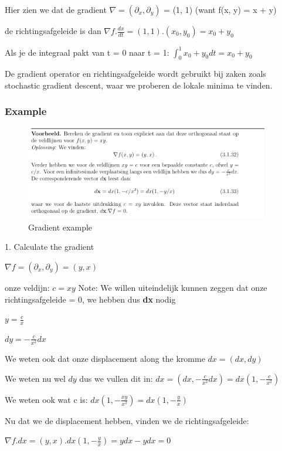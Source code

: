 \documentclass[a4paper]{report}
\begin{document}
Hier zien we dat de gradient $\nabla = (\partial_x, \partial_y)$ = (1, 1) (want f(x, y) = x + y)

de richtingsafgeleide is dan $\nabla f . \frac{dx}{dt} = (1, 1) . (x_0, y_0) = x_0 + y_0$

Als je de integraal pakt van t = 0 naar t = 1: $\int_0^1 x_0 + y_0 dt = x_0 + y_0$

De gradient operator en richtingsafgeleide wordt gebruikt bij zaken zoals stochastic gradient descent, waar we proberen de lokale minima te vinden.

\subsubsection{Example}
\begin{figure}[H]
	\begin{center}
		\includegraphics[width=0.95\textwidth]{./images/gradient_2.png}
	\end{center}
	\caption{Gradient example}
	\label{}
\end{figure}

1. Calculate the gradient

$\nabla f = (\partial_x, \partial_y) = (y, x)$

onze veldijn: $c = xy$
Note: We willen uiteindelijk kunnen zeggen dat onze richtingsafgeleide = 0, we hebben dus \textbf{dx} nodig

$y = \frac{c}{x}$

$dy = - \frac{c}{x^2} dx$

We weten ook dat onze displacement along the kromme $dx = (dx, dy)$

We weten nu wel $dy$ dus we vullen dit in: $dx = (dx, - \frac{c}{x^2} dx) = dx(1, - \frac{c}{x^2})$

We weten ook wat c is: $dx(1, - \frac{xy}{x^2}) = dx(1, - \frac{y}{x})$

Nu dat we de displacement hebben, vinden we de richtingsafgeleide:

$\nabla f . dx = (y, x) . dx(1, - \frac{y}{x}) = ydx - ydx = 0$
\end{document}
